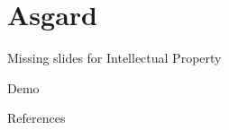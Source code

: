 \documentclass[aspectratio=169]{beamer}
\begin{document}
\section{Asgard}
{
\begin{frame}[standout]
  Missing slides for Intellectual Property
\end{frame}
}

{
\begin{frame}[standout]
  Demo
\end{frame}
}
\begin{frame}[allowframebreaks]{References}

  
  

\end{frame}
\end{document}
